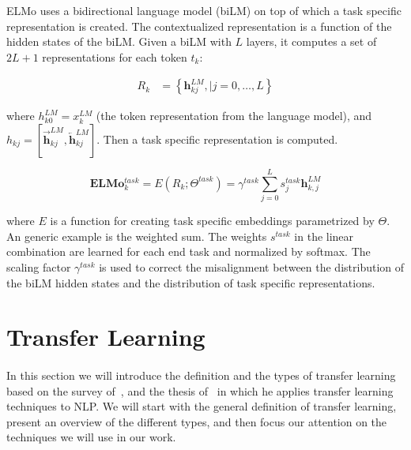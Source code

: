 ELMo uses a bidirectional language model (biLM) on top of which a task specific representation is created. The contextualized representation is a function of the hidden states of the biLM. Given a biLM with $L$ layers, it computes a set of $2L+1$ representations for each token $t_k$:

\begin{equation}
\begin{split}
R_{k} & =\left\{\mathbf{h}_{kj}^{LM},| j=0, \ldots, L\right\}    
\end{split}
\end{equation}
 

where $h_{k0}^{LM} = x_k^{LM}$ (the token representation from the language model), and $h_{kj} = [\overrightarrow{\mathbf{h}}_{k j}^{LM}, \overleftarrow{\mathbf{h}}_{k j}^{L M}]$. Then a task specific representation is computed.

\begin{equation}
\mathbf{E} \mathbf{L} \mathbf{M} \mathbf{o}_{k}^{task}=E\left(R_{k} ; \Theta^{task}\right)=\gamma^{t a s k} \sum_{j=0}^{L} s_{j}^{task} \mathbf{h}_{k, j}^{LM}
\end{equation}

where  $E$ is a function for creating task specific embeddings parametrized by $\Theta$. An generic example is the weighted sum. The weights $s^{task}$ in the linear combination are learned for each end task and normalized by softmax. The scaling factor $\gamma^{task}$ is used to correct the misalignment between the distribution of the biLM hidden states and the distribution of task specific representations.



\section{Transfer Learning}
\label{sec:transfer_learning}

\paragraph{}
In this section we will introduce the definition and the types of transfer learning based on the survey of~\cite{pan2010transfer}, and the thesis of~\cite{ruder2019neural} in which he applies transfer learning techniques to NLP. We will start with the general definition of transfer learning, present an overview of the different types, and then focus our attention on the techniques we will use in our work. 


